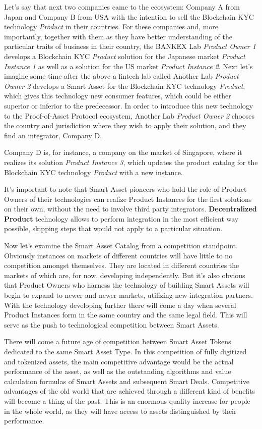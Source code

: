 \documentclass{article}
\begin{document}
\begin{multicols}{2}
Let’s say that next two companies came to the ecosystem: Company A from Japan and Company B from USA with the intention to sell the Blockchain KYC technology \textit{Product} in their countries. For these companies and, more importantly, together with them as they have better understanding of the particular traits of business in their country, the BANKEX Lab \textit{Product Owner 1} develops a Blockchain KYC \textit{Product} solution for the Japanese market \textit{Product Instance 1} as well as a solution for the US market \textit{Product Instance 2}.
Next let’s imagine some time after the above a fintech lab called Another Lab \textit{Product Owner 2} develops a Smart Asset for the Blockchain KYC technology \textit{Product}, which gives this technology new consumer features, which could be either superior or inferior to the predecessor. In order to introduce this new technology to the Proof-of-Asset Protocol ecosystem, Another Lab \textit{Product Owner 2} chooses the country and jurisdiction where they wish to apply their solution, and they find an integrator, Company D.

Company D is, for instance, a company on the market of Singapore, where it realizes its solution \textit{Product Instance 3}, which updates the product catalog for the Blockchain KYC technology \textit{Product} with a new instance.

It’s important to note that Smart Asset pioneers who hold the role of Product Owners of their technologies can realize Product Instances for the first solutions on their own, without the need to involve third party integrators. \textbf{Decentralized Product} technology allows to perform integration in the most efficient way possible, skipping steps that would not apply to a particular situation.

Now let's examine the Smart Asset Catalog from a competition standpoint. Obviously instances on markets of different countries will have little to no competition amongst themselves. They are located in different countries the markets of which are, for now, developing independently. But it’s also obvious that Product Owners who harness the technology of building Smart Assets will begin to expand to newer and newer markets, utilizing new integration partners. With the technology developing further there will come a day when several Product Instances form in the same country and the same legal field. This will serve as the push to technological competition between Smart Assets.

There will come a future age of competition between Smart Asset Tokens dedicated to the same Smart Asset Type. In this competition of fully digitized and tokenized assets, the main competitive advantage would be the actual performance of the asset, as well as the outstanding algorithms and value calculation formulas of Smart Assets and subsequent Smart Deals. Competitive advantages of the old world that are achieved through a different kind of benefits will become a thing of the past. This is an enormous quality increase for people in the whole world, as they will have access to assets distinguished by their performance. 


\end{multicols}
\end{document}
